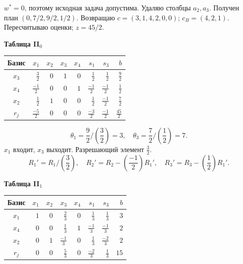 \documentclass[12pt,a4paper]{article}
\begin{document}
$w^*=0$, поэтому исходная задача допустима. Удаляю столбцы $a_2,a_3$.
Получен план $(0,7/2,9/2,1/2)$.
Возвращаю $c=(3,1,4,2,0,0)$; $c_B=(4,2,1)$.
Пересчитываю оценки; $z=45/2$.
\par\textbf{Таблица II$_{0}$}\begin{center}\small\setlength{\tabcolsep}{4pt}\begin{tabular}{c|rrrrrr|r}\hline
Базис & \cellcolor{cyan!18}$x_{1}$ & $x_{2}$ & $x_{3}$ & $x_{4}$ & $s_{1}$ & $s_{3}$ & $b$\\\hline
\rowcolor{yellow!25}$x_{3}$ & \cellcolor{orange!45}$\frac{3}{2}$ & $0$ & $1$ & $0$ & $\frac{1}{2}$ & $\frac{1}{2}$ & $\frac{9}{2}$\\
$x_{4}$ & \cellcolor{cyan!18}$\frac{-1}{2}$ & $0$ & $0$ & $1$ & $\frac{-1}{2}$ & $\frac{-1}{2}$ & $\frac{1}{2}$\\
$x_{2}$ & \cellcolor{cyan!18}$\frac{1}{2}$ & $1$ & $0$ & $0$ & $\frac{1}{2}$ & $\frac{-1}{2}$ & $\frac{7}{2}$\\
\hline $r_j$ & \cellcolor{cyan!18}$\frac{-5}{2}$ & $0$ & $0$ & $0$ & $\frac{-3}{2}$ & $\frac{-1}{2}$ & $\frac{45}{2}$\\\hline\end{tabular}\end{center}
\[\theta_{1}=\frac{9}{2}/(\frac{3}{2})=3,\quad \theta_{3}=\frac{7}{2}/(\frac{1}{2})=7.\]
$x_{1}$ входит, $x_{3}$ выходит. Разрешающий элемент $\frac{3}{2}$.
\[R_{1}'=R_{1}/(\frac{3}{2}),\quad R_{2}'=R_{2}-(\frac{-1}{2})R_{1}',\quad R_{3}'=R_{3}-(\frac{1}{2})R_{1}'.\]
\par\textbf{Таблица II$_{1}$}\begin{center}\small\setlength{\tabcolsep}{4pt}\begin{tabular}{c|rrrrrr|r}\hline
Базис & $x_{1}$ & $x_{2}$ & $x_{3}$ & $x_{4}$ & \cellcolor{cyan!18}$s_{1}$ & $s_{3}$ & $b$\\\hline
$x_{1}$ & $1$ & $0$ & $\frac{2}{3}$ & $0$ & \cellcolor{cyan!18}$\frac{1}{3}$ & $\frac{1}{3}$ & $3$\\
$x_{4}$ & $0$ & $0$ & $\frac{1}{3}$ & $1$ & \cellcolor{cyan!18}$\frac{-1}{3}$ & $\frac{-1}{3}$ & $2$\\
\rowcolor{yellow!25}$x_{2}$ & $0$ & $1$ & $\frac{-1}{3}$ & $0$ & \cellcolor{orange!45}$\frac{1}{3}$ & $\frac{-2}{3}$ & $2$\\
\hline $r_j$ & $0$ & $0$ & $\frac{5}{3}$ & $0$ & \cellcolor{cyan!18}$\frac{-2}{3}$ & $\frac{1}{3}$ & $15$\\\hline\end{tabular}\end{center}
\end{document}
